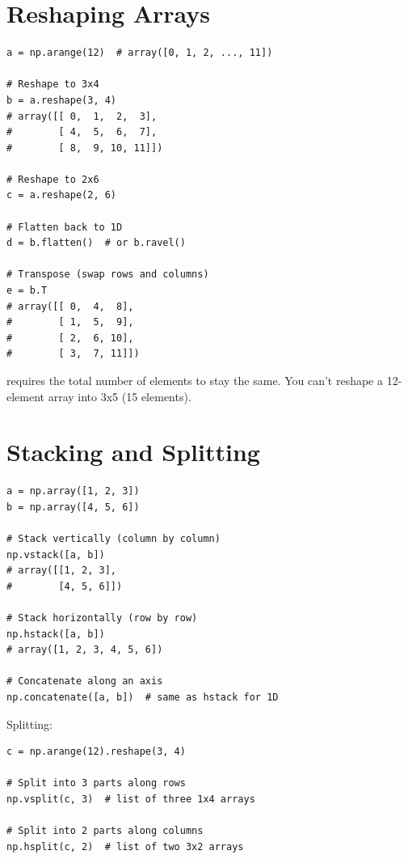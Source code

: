 \section{Reshaping Arrays}
\label{sec:reshaping}

\begin{lstlisting}
a = np.arange(12)  # array([0, 1, 2, ..., 11])

# Reshape to 3x4
b = a.reshape(3, 4)
# array([[ 0,  1,  2,  3],
#        [ 4,  5,  6,  7],
#        [ 8,  9, 10, 11]])

# Reshape to 2x6
c = a.reshape(2, 6)

# Flatten back to 1D
d = b.flatten()  # or b.ravel()

# Transpose (swap rows and columns)
e = b.T
# array([[ 0,  4,  8],
#        [ 1,  5,  9],
#        [ 2,  6, 10],
#        [ 3,  7, 11]])
\end{lstlisting}

\begin{warning}
 requires the total number of elements to stay the same. You can't reshape a 12-element array into 3x5 (15 elements).
\end{warning}

\section{Stacking and Splitting}
\label{sec:stacking}

\begin{lstlisting}
a = np.array([1, 2, 3])
b = np.array([4, 5, 6])

# Stack vertically (column by column)
np.vstack([a, b])
# array([[1, 2, 3],
#        [4, 5, 6]])

# Stack horizontally (row by row)
np.hstack([a, b])
# array([1, 2, 3, 4, 5, 6])

# Concatenate along an axis
np.concatenate([a, b])  # same as hstack for 1D
\end{lstlisting}

Splitting:

\begin{lstlisting}
c = np.arange(12).reshape(3, 4)

# Split into 3 parts along rows
np.vsplit(c, 3)  # list of three 1x4 arrays

# Split into 2 parts along columns
np.hsplit(c, 2)  # list of two 3x2 arrays
\end{lstlisting}

